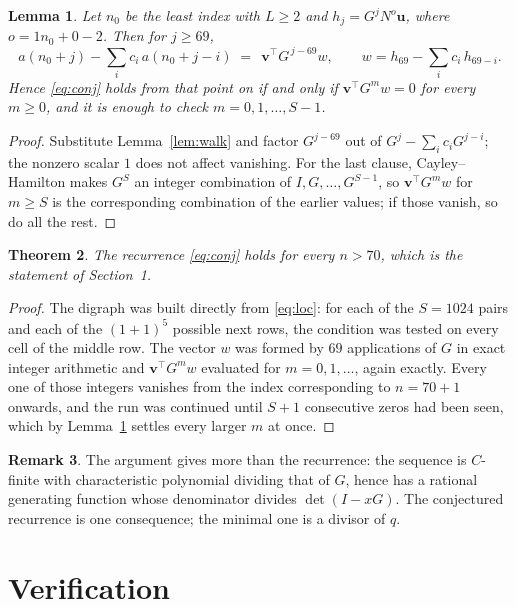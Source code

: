 \documentclass[11pt,a4paper]{article}
\theoremstyle{plain}
\newtheorem{theorem}{Theorem}
\newtheorem{lemma}[theorem]{Lemma}
\theoremstyle{definition}
\newtheorem{remark}[theorem]{Remark}
\begin{document}
\begin{lemma}\label{lem:crit}
Let $n_0$ be the least index with $L\ge2$ and $h_j=G^{j}N^{o}\mathbf{u}$, where
$o=1n_0+0-2$. Then for $j\ge69$,
\[
a(n_0+j)-\sum_i c_i\,a(n_0+j-i)\;=\;\,\mathbf{v}^{\!\top}G^{\,j-69}w,
\qquad w=h_{69}-\sum_i c_i\,h_{69-i} .
\]
Hence \eqref{eq:conj} holds from that point on if and only if
$\mathbf{v}^{\!\top}G^{m}w=0$ for every $m\ge0$, and it is enough to check
$m=0,1,\dots,S-1$.
\end{lemma}

\begin{proof}
Substitute Lemma~\ref{lem:walk} and factor $G^{j-69}$ out of
$G^{j}-\sum_ic_iG^{j-i}$; the nonzero scalar $1$ does not affect
vanishing. For the last clause, Cayley--Hamilton makes $G^{S}$ an integer combination of
$I,G,\dots,G^{S-1}$, so $\mathbf{v}^{\!\top}G^{m}w$ for $m\ge S$ is the corresponding
combination of the earlier values; if those vanish, so do all the rest.
\end{proof}

\begin{theorem}
The recurrence \eqref{eq:conj} holds for every $n>70$, which is the statement of
Section~1.
\end{theorem}

\begin{proof}
The digraph was built directly from \eqref{eq:loc}: for each of the $S=1024$ pairs and each
of the $(1+1)^{5}$ possible next rows, the condition was tested on every cell of
the middle row. The vector $w$ was formed by $69$ applications of $G$ in exact integer
arithmetic and $\mathbf{v}^{\!\top}G^{m}w$ evaluated for $m=0,1,\dots$, again exactly.
Every one of those integers vanishes from the index corresponding to $n=70+1$ onwards,
and the run was continued until $S+1$ consecutive zeros had been seen, which by
Lemma~\ref{lem:crit} settles every larger $m$ at once.
\end{proof}

\begin{remark}
The argument gives more than the recurrence: the sequence is $C$-finite with characteristic
polynomial dividing that of $G$, hence has a rational generating function whose denominator
divides $\det(I-xG)$. The conjectured recurrence is one consequence; the minimal one is a
divisor of $q$.
\end{remark}

\section{Verification}
\end{document}
